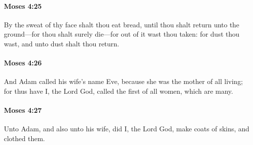 		\paragraph{Moses 4:25} %
			\label{MOSES-4-25}

			By the sweat of thy face shalt thou eat bread, until thou shalt return unto the ground---for thou shalt surely die---for out of it wast thou taken: for dust thou wast, and unto dust shalt thou return.


		\paragraph{Moses 4:26} %
			\label{MOSES-4-26}

			And Adam called his wife's name Eve, because she was the mother of all living; for thus have I, the Lord God, called the first of all women, which are many.


		\paragraph{Moses 4:27} %
			\label{MOSES-4-27}

			Unto Adam, and also unto his wife, did I, the Lord God, make coats of skins, and clothed them.


